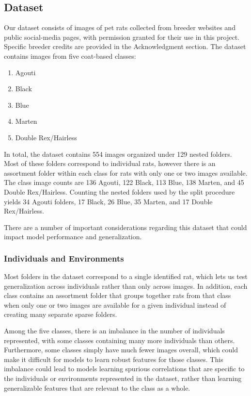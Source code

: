 \documentclass[conference]{IEEEtran}
\begin{document}
\subsection{Dataset}

Our dataset consists of images of pet rats collected from breeder websites and public social-media pages, with permission granted for their use in this project. Specific breeder credits are provided in the Acknowledgment section. The dataset contains images from five coat-based classes:

\begin{enumerate}
    \item Agouti
    \item Black
    \item Blue
    \item Marten
    \item Double Rex/Hairless
\end{enumerate}

In total, the dataset contains 554 images organized under 129 nested folders. Most of these folders correspond to individual rats, however there is an assortment folder within each class for rats with only one or two images available. The class image counts are 136 Agouti, 122 Black, 113 Blue, 138 Marten, and 45 Double Rex/Hairless. Counting the nested folders used by the split procedure yields 34 Agouti folders, 17 Black, 26 Blue, 35 Marten, and 17 Double Rex/Hairless.

There are a number of important considerations regarding this dataset that could impact model performance and generalization.

\subsubsection{Individuals and Environments}

Most folders in the dataset correspond to a single identified rat, which lets us test generalization across individuals rather than only across images. In addition, each class contains an assortment folder that groups together rats from that class when only one or two images are available for a given individual instead of creating many separate sparse folders.

Among the five classes, there is an imbalance in the number of individuals represented, with some classes containing many more individuals than others. Furthermore, some classes simply have much fewer images overall, which could make it difficult for models to learn robust features for those classes. This imbalance could lead to models learning spurious correlations that are specific to the individuals or environments represented in the dataset, rather than learning generalizable features that are relevant to the class as a whole.
\end{document}
